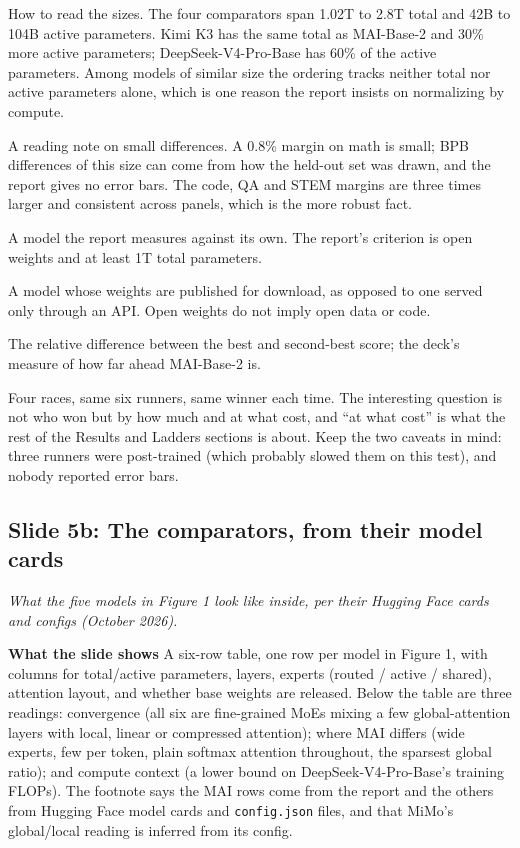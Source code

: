 \documentclass[11pt,letterpaper]{article}
\newcommand{\slide}[3]{%
  \subsection[Slide #1: #2]{Slide #1: #2}%
  {\color{muted}\itshape #3\par}\medskip}
\newcommand{\para}[1]{\medskip\noindent\textbf{#1}\quad}
\newenvironment{terms}{\begin{tcolorbox}[termsbox]\begin{description}[leftmargin=1.1em,itemsep=3pt,topsep=2pt,font=\normalfont]}{\end{description}\end{tcolorbox}}
\newcommand{\term}[2]{\item[\textbf{#1}]\index{#1} #2}
\newenvironment{intuition}{\begin{tcolorbox}[intuitionbox]}{\end{tcolorbox}}
\begin{document}
How to read the sizes. The four comparators span 1.02T to 2.8T total and 42B to 104B active parameters. Kimi K3 has the same total as MAI-Base-2 and 30\% more active parameters; DeepSeek-V4-Pro-Base has 60\% of the active parameters. Among models of similar size the ordering tracks neither total nor active parameters alone, which is one reason the report insists on normalizing by compute.

A reading note on small differences. A 0.8\% margin on math is small; BPB differences of this size can come from how the held-out set was drawn, and the report gives no error bars. The code, QA and STEM margins are three times larger and consistent across panels, which is the more robust fact.

\begin{terms}
\term{comparator}{A model the report measures against its own. The report's criterion is open weights and at least 1T total parameters.}
\term{open-weight model}{A model whose weights are published for download, as opposed to one served only through an API. Open weights do not imply open data or code.}
\term{runner-up margin}{The relative difference between the best and second-best score; the deck's measure of how far ahead MAI-Base-2 is.}
\end{terms}

\begin{intuition}
Four races, same six runners, same winner each time. The interesting question is not who won but by how much and at what cost, and ``at what cost'' is what the rest of the Results and Ladders sections is about. Keep the two caveats in mind: three runners were post-trained (which probably slowed them on this test), and nobody reported error bars.
\end{intuition}

\slide{5b}{The comparators, from their model cards}{What the five models in Figure 1 look like inside, per their Hugging Face cards and configs (October 2026).}

\para{What the slide shows} A six-row table, one row per model in Figure 1, with columns for total/active parameters, layers, experts (routed / active / shared), attention layout, and whether base weights are released. Below the table are three readings: convergence (all six are fine-grained MoEs mixing a few global-attention layers with local, linear or compressed attention); where MAI differs (wide experts, few per token, plain softmax attention throughout, the sparsest global ratio); and compute context (a lower bound on DeepSeek-V4-Pro-Base's training FLOPs). The footnote says the MAI rows come from the report and the others from Hugging Face model cards and \texttt{config.json} files, and that MiMo's global/local reading is inferred from its config.
\end{document}
